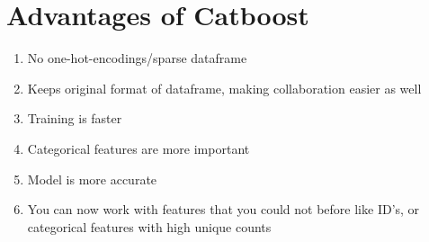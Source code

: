 \documentclass[journal,12pt,onecolumn]{IEEEtran}
\theoremstyle{remark}
\numberwithin{equation}{section}
\begin{document}
                \section{Advantages of Catboost}
		  \begin{enumerate}
		   \item  No one-hot-encodings/sparse dataframe
                   \item  Keeps original format of dataframe, making collaboration easier as well
                   \item  Training is faster
                   \item  Categorical features are more important
                   \item  Model is more accurate
                   \item  You can now work with features that you could not before like ID’s, or categorical features with high unique counts
	          \end{enumerate}

	
\end{document}
